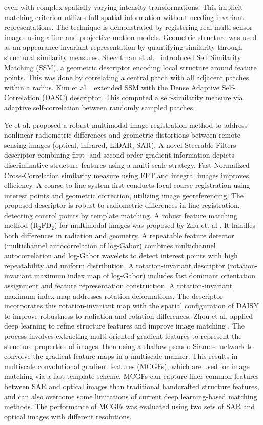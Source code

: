 \documentclass[10pt,journal]{IEEEtran}\usepackage{amsfonts}
\begin{document}
even with complex spatially-varying intensity transformations. This implicit
matching criterion utilizes full spatial information without needing
invariant representations. The technique is demonstrated by registering real
multi-sensor images using affine and projective motion models. Geometric
structure was used as an appearance-invariant representation by quantifying
similarity through structural similarity measures. Shechtman et al.~\cite {shechtman2007matching} introduced Self Similarity Matching (SSM), a
geometric descriptor encoding local structure around feature points. This
was done by correlating a central patch with all adjacent patches within a
radius. Kim et al.~\cite{kim2015dasc} extended SSM with the Dense Adaptive
Self-Correlation (DASC) descriptor. This computed a self-similarity measure
via adaptive self-correlation between randomly sampled patches.

Ye et al. proposed a robust multimodal image registration method \cite {YE2022331} to address nonlinear radiometric differences and geometric
distortions between remote sensing images (optical, infrared, LiDAR, SAR). A
novel Steerable Filters descriptor combining first- and second-order
gradient information depicts discriminative structure features using a
multi-scale strategy. Fast Normalized Cross-Correlation similarity measure
using FFT and integral images improves efficiency. A coarse-to-fine system
first conducts local coarse registration using interest points and geometric
correction, utilizing image georeferencing. The proposed descriptor is
robust to radiometric differences in fine registration, detecting control
points by template matching. A robust feature matching method (R$_{2}$FD$_{2} $) for multimodal images was proposed by Zhu et. al \cite{10092838}. It
handles both differences in radiation and geometry. A repeatable feature
detector (multichannel autocorrelation of log-Gabor) combines multichannel
autocorrelation and log-Gabor wavelets to detect interest points with high
repeatability and uniform distribution. A rotation-invariant descriptor
(rotation-invariant maximum index map of log-Gabor) includes fast dominant
orientation assignment and feature representation construction. A
rotation-invariant maximum index map addresses rotation deformations. The
descriptor incorporates this rotation-invariant map with the spatial
configuration of DAISY to improve robustness to radiation and rotation
differences. Zhou et al. applied deep learning to refine structure features
and improve image matching \cite{9541389}. The process involves extracting
multi-oriented gradient features to represent the structure properties of
images, then using a shallow pseudo-Siamese network to convolve the gradient
feature maps in a multiscale manner. This results in multiscale
convolutional gradient features (MCGFs), which are used for image matching
via a fast template scheme. MCGFs can capture finer common features between
SAR and optical images than traditional handcrafted structure features, and
can also overcome some limitations of current deep learning-based matching
methods. The performance of MCGFs was evaluated using two sets of SAR and
optical images with different resolutions.
\end{document}
